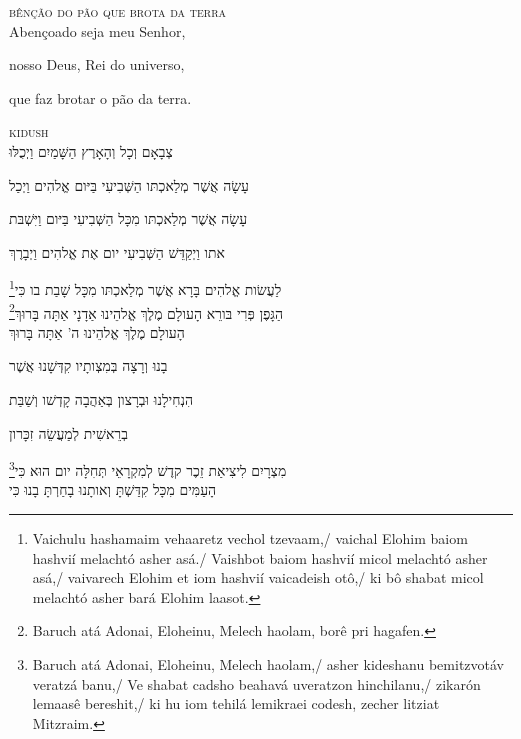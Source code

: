\vspace*{1cm}

\textsc{bênção do pão que brota da terra}\\[15pt]

Abençoado seja meu Senhor,

nosso Deus, Rei do universo,

que faz brotar o pão da terra.


\movetoevenpage
\raggedleft


\vspace*{1cm}

\textsc{kidush}\\[15pt]

צְבָאָם וְכָל וְהָאָרֶץ הַשָּׁמַיִם וַיְכֻלּוּ 

עָשָׂה אֲשֶׁר מְלַאכְתּו הַשְּׁבִיעִי בַּיּום אֱלהִים וַיְכַל 

עָשָׂה אֲשֶׁר מְלַאכְתּו מִכָּל הַשְּׁבִיעִי בַּיּום וַיִּשְׁבּת 

אתו וַיְקַדֵּשׁ הַשְּׁבִיעִי יום אֶת אֱלהִים וַיְבָרֶךְ 

\footnote{Vaichulu hashamaim vehaaretz vechol tzevaam,/ vaichal Elohim baiom hashvií melachtó asher asá./ Vaishbot baiom hashvií micol melachtó asher asá,/ vaivarech Elohim et iom hashvií vaicadeish otô,/ ki bô shabat micol melachtó asher bará Elohim laasot.}לַעֲשׂות אֱלהִים בָּרָא אֲשֶׁר מְלַאכְתּו מִכָּל שָׁבַת בו כִּי\\[10pt] 

\footnote{Baruch atá Adonai, Eloheinu, Melech haolam, borê pri hagafen.}הַגָּפֶן פְּרִי בּורֵא הָעולָם מֶלֶךְ אֱלהֵינוּ אַדָנָי אַתָּה בָּרוּךְ\\[10pt] %

הָעולָם מֶלֶךְ אֱלהֵינוּ ה' אַתָּה בָּרוּךְ

בָנוּ וְרָצָה בְּמִצְותָיו קִדְּשָׁנוּ אֲשֶׁר

הִנְחִילָנוּ וּבְרָצון בְּאַהֲבָה קָדְשׁו וְשַׁבַּת

בְרֵאשִׁית לְמַעֲשֵׂה זִכָּרון

\footnote{Baruch atá Adonai, Eloheinu, Melech haolam,/ asher kideshanu bemitzvotáv veratzá banu,/ Ve shabat cadsho beahavá uveratzon hinchilanu,/ zikarón lemaasê bereshit,/ ki hu iom tehilá lemikraei codesh, zecher litziat Mitzraim.}מִצְרָיִם לִיצִיאַת זֵכֶר קדֶשׁ לְמִקְרָאֵי תְּחִלָּה יום הוּא כִּי\\[10pt]

הָעַמִּים מִכָּל קִדַּשְׁתָּ וְאותָנוּ בָחַרְתָּ בָנוּ כִּי

